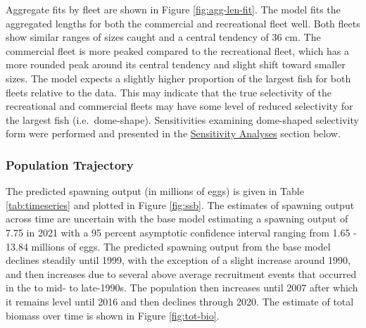 \documentclass[11pt,
  english,
  a4paper,
]{article}
\begin{document}

Aggregate fits by fleet are shown in Figure \ref{fig:agg-len-fit}. The model fits the aggregated lengths for both the commercial and recreational fleet well. Both fleets show similar ranges of sizes caught and a central tendency of 36 cm. The commercial fleet is more peaked compared to the recreational fleet, which has a more rounded peak around its central tendency and slight shift toward smaller sizes. The model expects a slightly higher proportion of the largest fish for both fleets relative to the data. This may indicate that the true selectivity of the recreational and commercial fleets may have some level of reduced selectivity for the largest fish (i.e.~dome-shape). Sensitivities examining dome-shaped selectivity form were performed and presented in the {\protect\hyperlink{sensitivity-analyses}{Sensitivity Analyses}\leavevmode\tagmcend\tagstructend} section below.

\leavevmode\tagmcend\tagstructend\par


\hypertarget{population-trajectory}{%
\subsubsection{Population Trajectory}\label{population-trajectory}}

\leavevmode\tagmcend\tagstructend


The predicted spawning output (in millions of eggs) is given in Table \ref{tab:timeseries} and plotted in Figure \ref{fig:ssb}. The estimates of spawning output across time are uncertain with the base model estimating a spawning output of 7.75 in 2021 with a 95 percent asymptotic confidence interval ranging from 1.65 - 13.84 millions of eggs. The predicted spawning output from the base model declines steadily until 1999, with the exception of a slight increase around 1990, and then increases due to several above average recruitment events that occurred in the to mid- to late-1990s. The population then increases until 2007 after which it remains level until 2016 and then declines through 2020. The estimate of total biomass over time is shown in Figure \ref{fig:tot-bio}.

\leavevmode\tagmcend\tagstructend\par
\end{document}
